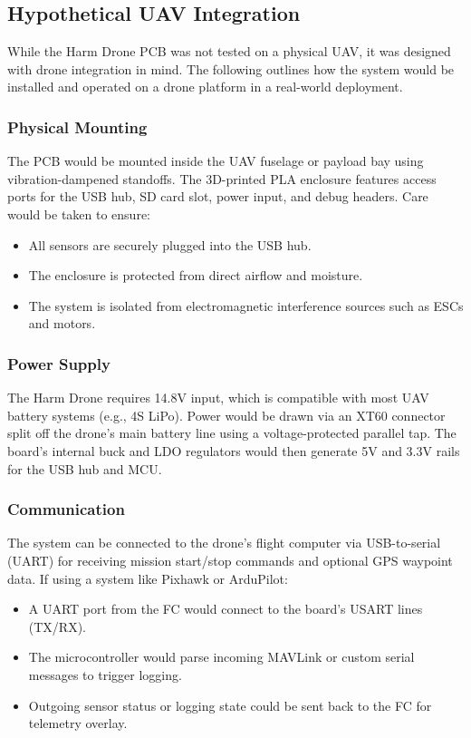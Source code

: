 \documentclass[12pt]{article}
\begin{document}
\subsection{Hypothetical UAV Integration}

While the Harm Drone PCB was not tested on a physical UAV, it was designed with drone integration in mind. The following outlines how the system would be installed and operated on a drone platform in a real-world deployment.

\subsubsection{Physical Mounting}
The PCB would be mounted inside the UAV fuselage or payload bay using vibration-dampened standoffs. The 3D-printed PLA enclosure features access ports for the USB hub, SD card slot, power input, and debug headers. Care would be taken to ensure:

\begin{itemize}
    \item All sensors are securely plugged into the USB hub.
    \item The enclosure is protected from direct airflow and moisture.
    \item The system is isolated from electromagnetic interference sources such as ESCs and motors.
\end{itemize}

\subsubsection*{Power Supply}
The Harm Drone requires 14.8V input, which is compatible with most UAV battery systems (e.g., 4S LiPo). Power would be drawn via an XT60 connector split off the drone’s main battery line using a voltage-protected parallel tap. The board's internal buck and LDO regulators would then generate 5V and 3.3V rails for the USB hub and MCU.

\subsubsection{Communication}
The system can be connected to the drone’s flight computer via USB-to-serial (UART) for receiving mission start/stop commands and optional GPS waypoint data. If using a system like Pixhawk or ArduPilot:

\begin{itemize}
    \item A UART port from the FC would connect to the board’s USART lines (TX/RX).
    \item The microcontroller would parse incoming MAVLink or custom serial messages to trigger logging.
    \item Outgoing sensor status or logging state could be sent back to the FC for telemetry overlay.
\end{itemize}
\end{document}
